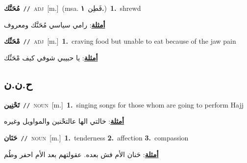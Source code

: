 \documentclass[10pt,a4paper,twoside]{article} %
\begin{document}
\begin{multicols}{2}
{\setlength\topsep{0pt}\textbf{\foreignlanguage{arabic}{مُحَنَّك}}\ {\color{gray}\texttt{//}\color{black}}\ \textsc{adj}\ [m.]\ \color{gray}(msa. \foreignlanguage{arabic}{فَطِن}~\foreignlanguage{arabic}{\textbf{١.}})\color{black}\ \textbf{1.}~shrewd\  \begin{flushright}\color{gray}\foreignlanguage{arabic}{\textbf{\underline{\foreignlanguage{arabic}{أمثلة}}}: رامي سياسي مُحَنَّك ومعروف}\end{flushright}\color{black}} \vspace{2mm}

{\setlength\topsep{0pt}\textbf{\foreignlanguage{arabic}{مْحَنِّك}}\ {\color{gray}\texttt{//}\color{black}}\ \textsc{adj}\ [m.]\ \textbf{1.}~craving food but unable to eat because of the jaw pain\  \begin{flushright}\color{gray}\foreignlanguage{arabic}{\textbf{\underline{\foreignlanguage{arabic}{أمثلة}}}: يا حبيبي شوفي كيف مْحَنِّك}\end{flushright}\color{black}} \vspace{2mm}

\vspace{-3mm}
\subsection*{\color{blue}\foreignlanguage{arabic}{ح.ن.ن}\color{blue}{}} 

{\setlength\topsep{0pt}\textbf{\foreignlanguage{arabic}{تَحْنِين}}\ {\color{gray}\texttt{//}\color{black}}\ \textsc{noun}\ [m.]\ \textbf{1.}~singing songs for those whom are going to perform Hajj\  \begin{flushright}\color{gray}\foreignlanguage{arabic}{\textbf{\underline{\foreignlanguage{arabic}{أمثلة}}}: خالتي الها عالتحْنين والمواويل وغيره}\end{flushright}\color{black}} \vspace{2mm}

{\setlength\topsep{0pt}\textbf{\foreignlanguage{arabic}{حَنَان}}\ {\color{gray}\texttt{//}\color{black}}\ \textsc{noun}\ [m.]\ \textbf{1.}~tenderness  \textbf{2.}~affection  \textbf{3.}~compassion\  \begin{flushright}\color{gray}\foreignlanguage{arabic}{\textbf{\underline{\foreignlanguage{arabic}{أمثلة}}}: حَنان الأم فش بعده. عقولتهم بعد الأم احفر وطُم}\end{flushright}\color{black}} \vspace{2mm}


\end{multicols}
\end{document}
